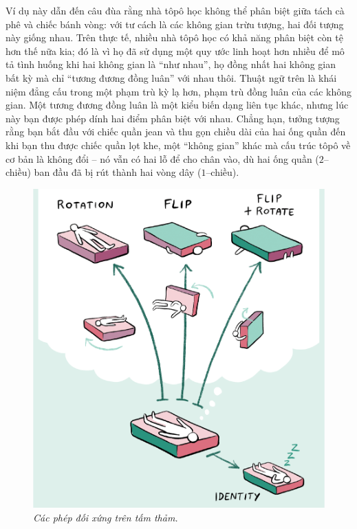 \begin{multicols}{2}
	\vskip 0.1cm
	Ví dụ này dẫn đến câu đùa rằng nhà tôpô học không thể phân biệt giữa tách cà phê và chiếc bánh vòng: với tư cách là các không gian trừu tượng, hai đối tượng này giống nhau. Trên thực tế, nhiều nhà tôpô học có khả năng phân biệt còn tệ hơn thế nữa kia; đó là vì họ đã sử dụng một quy ước linh hoạt hơn nhiều để mô tả tình huống khi hai không gian là ``như nhau'', họ đồng nhất hai không gian bất kỳ mà chỉ ``tương đương đồng luân'' với nhau thôi. Thuật ngữ trên là khái niệm đẳng cấu trong một phạm trù kỳ lạ hơn, phạm trù đồng luân của các không gian. Một tương đương đồng luân là một kiểu biến dạng liên tục khác, nhưng lúc này bạn được phép dính hai điểm phân biệt với nhau. Chẳng hạn, tưởng tượng rằng bạn bắt đầu với chiếc quần jean và thu gọn chiều dài của hai ống quần đến khi bạn thu được chiếc quần lọt khe, một ``không gian'' khác mà cấu trúc tôpô về cơ bản là không đổi -- nó vẫn có hai lỗ để cho chân vào, dù hai ống quần ($2$--chiều) ban đầu đã bị rút thành hai vòng dây ($1$--chiều).
	\begin{figure}[H]
		\centering
		\vspace*{5pt}
		\captionsetup{labelformat= empty, justification=centering}
		\includegraphics[width=1\linewidth]{6}
		\caption{\small\textit{\color{duongvaotoanhoc}Các phép đối xứng trên tấm thảm.}}

\end{figure}
\end{multicols}
